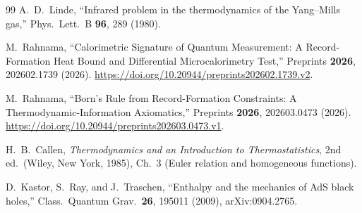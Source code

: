 \documentclass[%
 aip,
 amsmath,amssymb,
 reprint,%
]{revtex4-2}
\begin{document}
\begin{thebibliography}{99}
A.~D.~Linde, ``Infrared problem in the thermodynamics of the
Yang--Mills gas,''
Phys.\ Lett.\ B \textbf{96}, 289 (1980).

M.~Rahnama, ``Calorimetric Signature of Quantum Measurement: A
Record-Formation Heat Bound and Differential Microcalorimetry Test,''
Preprints \textbf{2026}, 202602.1739 (2026).
\url{https://doi.org/10.20944/preprints202602.1739.v2}.

M.~Rahnama, ``Born's Rule from Record-Formation Constraints: A
Thermodynamic-Information Axiomatics,''
Preprints \textbf{2026}, 202603.0473 (2026).
\url{https://doi.org/10.20944/preprints202603.0473.v1}.

H.~B.~Callen, \emph{Thermodynamics and an Introduction to
Thermostatistics}, 2nd ed.\ (Wiley, New York, 1985),
Ch.~3 (Euler relation and homogeneous functions).

D.~Kastor, S.~Ray, and J.~Traschen, ``Enthalpy and the mechanics
of AdS black holes,''
Class.\ Quantum Grav.\ \textbf{26}, 195011 (2009),
arXiv:0904.2765.

\end{thebibliography}
\end{document}
